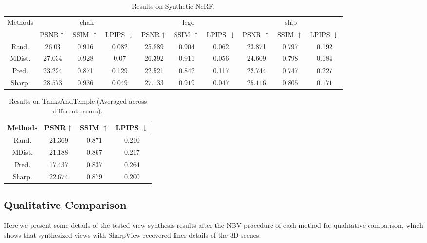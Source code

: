 \begin{table}[h!]
    \centering
    \caption{Results on Synthetic-NeRF. }
    \begin{tabular}{|c|c|c|c|c|c|c|c|c|c|}
        \hline
        \multirow{2}{*}{Methods} & \multicolumn{3}{c|}{chair} &  \multicolumn{3}{c|}{lego} &  \multicolumn{3}{c|}{ship} \\ \cline{2-10}
         & PSNR$\uparrow$ & SSIM $\uparrow$& LPIPS $\downarrow$ & PSNR$\uparrow$ & SSIM $\uparrow$& LPIPS $\downarrow$& PSNR $\uparrow$& SSIM $\uparrow$& LPIPS $\downarrow$

         \\ \hline Rand.  & 26.03 & 0.916 & 0.082 & 25.889 & 0.904 & 0.062 & 23.871 & 0.797 & 0.192
         \\ \hline MDist.  & 27.034 & 0.928 & 0.07 & 26.392 & 0.911 & 0.056 & 24.609 & 0.798 & 0.184
         \\ \hline Pred.  & 23.224 & 0.871 & 0.129 & 22.521 & 0.842 & 0.117 & 22.744 & 0.747 & 0.227
         \\ \hline Sharp.  & $\bm{28.573}$ & $\bm{0.936}$ & $\bm{0.049}$ & $\bm{27.133}$ & $\bm{0.919}$ & $\bm{0.047}$ & $\bm{25.116}$ & $\bm{0.805}$ & $\bm{0.171}$
         \\ \hline
    \end{tabular}
    \label{nerf}
\end{table}


\begin{table}[h!]
    \centering
    \caption{Results on TanksAndTemple (Averaged across different scenes). }
    \begin{tabular}{|c|c|c|c|}
        \hline
        Methods & PSNR$\uparrow$ & SSIM $\uparrow$& LPIPS $\downarrow$ 

         \\ \hline Rand.  & 21.369 & 0.871 & 0.210
         \\ \hline MDist.  & 21.188 & 0.867 & 0.217
         \\ \hline Pred.  & 17.437 & 0.837 & 0.264
         \\ \hline Sharp.  & $\bm{22.674}$ & $\bm{0.879}$ & $\bm{0.200}$
         \\ \hline
    \end{tabular}
    \label{tank}
\end{table}

\subsection{Qualitative Comparison}
Here we present some details of the tested view synthesis results after the NBV procedure of each method for qualitative comparison, which shows that synthesized views with SharpView recovered finer details of the 3D scenes.


